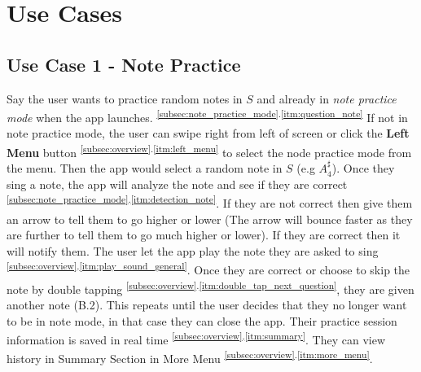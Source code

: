 \documentclass{article}
\begin{document}
\section{Use Cases}
\subsection{Use Case 1 - Note Practice}
\qquad
		Say the user wants to practice random notes in $S$ and already in \textit{note practice mode} when the app launches. \textsuperscript{\ref{subsec:note_practice_mode}.\ref{itm:question_note}}
		If not in note practice mode, the user can swipe right from left of screen or click  the \textbf{Left Menu} button \textsuperscript{\ref{subsec:overview}.\ref{itm:left_menu}} to select the node practice mode from the menu.
    Then the app would select a random note in $S$ (e.g $A_4^\sharp$). Once they sing a note, the app will analyze the note and see if they are correct \textsuperscript{\ref{subsec:note_practice_mode}.\ref{itm:detection_note}}. 
    If they are not correct then give them an arrow to tell them to go higher or lower (The arrow will bounce faster as they are further to tell them to go much higher or lower). 
    If they are correct then it will notify them. 
    The user let the app play the note they are asked to sing \textsuperscript{\ref{subsec:overview}.\ref{itm:play_sound_general}}. 
    Once they are correct or choose to skip the note by double tapping \textsuperscript{\ref{subsec:overview}.\ref{itm:double_tap_next_question}}, they are given another note (B.2). 
    This repeats until the user decides that they no longer want to be in note mode, in that case they can close the app. 
    Their practice session information is saved in real time \textsuperscript{\ref{subsec:overview}.\ref{itm:summary}}. 
    They can view history in Summary Section in More Menu \textsuperscript{\ref{subsec:overview}.\ref{itm:more_menu}}.
\end{document}
